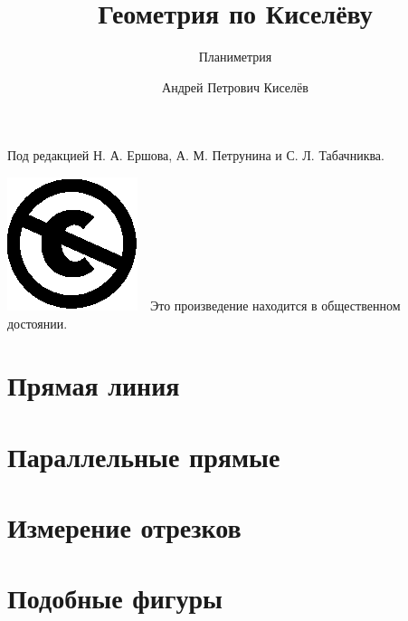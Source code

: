 \documentclass[twoside]{book}
\begin{document}
\frontmatter
\title{Геометрия по Киселёву}
\subtitle{Планиметрия}
\author{Андрей Петрович Киселёв
}
\date{}
\maketitle

\thispagestyle{empty}

Под редакцией Н. А. Ершова, А. М. Петрунина и С. Л. Табачниква.

\vfill
\noindent
\includegraphics[scale=.25]{eps/Cc-public_domain_mark_white}\ \ 
Это произведение находится в общественном достоянии.

\mainmatter





\chapter{Прямая линия}





\chapter{Параллельные прямые}










\chapter{Измерение отрезков}



\chapter{Подобные фигуры}







\end{document}
